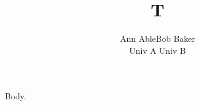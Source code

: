 \documentclass{article}
\title{T}
\author{Ann Able\up{1}\hfill Bob Baker\up{1,2}\\
\up{1}Univ A \quad \up{2}Univ B}
\begin{document}
\maketitle
Body.
\end{document}
